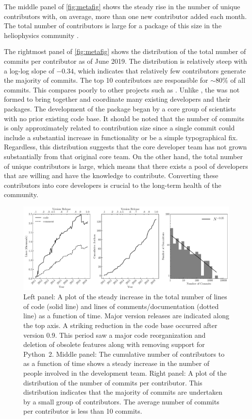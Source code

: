 The middle panel of \autoref{fig:metafig} shows the steady rise in the number of unique contributors with, on average, more than one new contributor added each month.
The total number of contributors is large for a package of this size in the heliophysics community \citep{pyhc2018}.

The rightmost panel of \autoref{fig:metafig} shows the distribution of the total number of commits per contributor as of June 2019.
The distribution is relatively steep with a log-log slope of $-0.34$, which indicates that relatively few contributors generate the majority of commits.
The top 10 contributors are responsible for ${\sim}80\%$ of all commits.
This compares poorly to other projects such as \astropy \citep{astropy2018}.
Unlike \astropy, the \sunpyproj was not formed to bring together and coordinate many existing developers and their \python packages.
The development of the \sunpypkg package began by a core group of scientists with no prior existing code base.
It should be noted that the number of commits is only approximately related to contribution size since a single commit could include a substantial increase in functionality or be a simple typographical fix.
Regardless, this distribution suggests that the core developer team has not grown substantially from that original core team.
On the other hand, the total number of unique contributors is large, which means that there exists a pool of \sunpypkg developers that are willing and have the knowledge to contribute.
Converting these contributors into core developers is crucial to the long-term health of the community.


\begin{figure}
    \center
    \includegraphics[width = 1.0\textwidth]{figures/dev_meta.pdf}
    \caption{Left panel: A plot of the steady increase in the total number of lines of code (solid line) and lines of comments/documentation (dotted line) as a function of time.
	Major version releases are indicated along the top axis.
	A striking reduction in the code base occurred after version 0.9.
	This period saw a major code reorganization and deletion of obsolete features along with removing support for Python~2.
	Middle panel: The cumulative number of contributors to \sunpypkg as a function of time shows a steady increase in the number of people involved in the development team.
	Right panel: A plot of the distribution of the number of commits per contributor.
	This distribution indicates that the majority of commits are undertaken by a small group of contributors. The average number of commits per contributor is less than 10 commits.}
\label{fig:metafig}
\end{figure}
